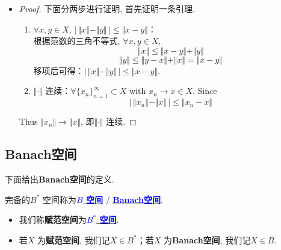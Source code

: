 \begin{defn}
\begin{rmk}
\begin{itemize}
				\begin{itemize}
					\item 
					\begin{proof}
						下面分两步进行证明, 首先证明一条引理. 
						\begin{enumerate}
							\item $\forall x , y \in X$, $\Big| \, \Vert x \Vert - \Vert y \Vert \, \Big| \leq \Vert x - y \Vert$：\\
							根据范数的三角不等式, $\forall x , y \in X$,
							\[ \Vert x \Vert \leq \Vert x - y \Vert + \Vert y \Vert \]
							\[ \Vert y \Vert \leq \Vert y - x \Vert + \Vert x \Vert = \Vert x - y \Vert \]
							移项后可得：$\Big| \, \Vert x \Vert - \Vert y \Vert \, \Big| \leq \Vert x - y \Vert$.
							
							\vspace*{1em}
							
							\item $\Vert \cdot \Vert$ 连续：$\forall \{ x_n \}_{n = 1}^{\infty} \subset X$ with $x_n \to x \in X$. Since
							\[ \Big| \, \Vert x_n \Vert - \Vert x \Vert \, \Big| \leq \Vert x_n - x \Vert \]
							
						\end{enumerate}
						Thus $\Vert x_n \Vert \to \Vert x \Vert$, 即$\Vert \cdot \Vert$ 连续.
					\end{proof}
				\end{itemize}
			\end{itemize}
		\end{rmk}
	\end{defn}

\newpage

\subsection{Banach空间}
	下面给出\textbf{Banach空间}的定义.
	
	\begin{defn}\label{def 2.1.2}
		完备的$B^*$ 空间称为\underline{\textcolor{blue}{\textbf{$B$ 空间}}} / \underline{\textcolor{blue}{\textbf{Banach空间}}}. 
		
		\vspace*{2em}
		
		\begin{rmk}
			\begin{itemize}
				\item 我们称\textbf{赋范空间}为\underline{\textcolor{blue}{\textbf{$B^*$ 空间}}}. 
				
				\vspace*{1em}
				
				\item 若$X$ 为\textbf{赋范空间}, 我们记$X \in B^*$；若$X$ 为\textbf{Banach空间}, 我们记$X \in B$.
			\end{itemize}
		\end{rmk}
	\end{defn}
	
